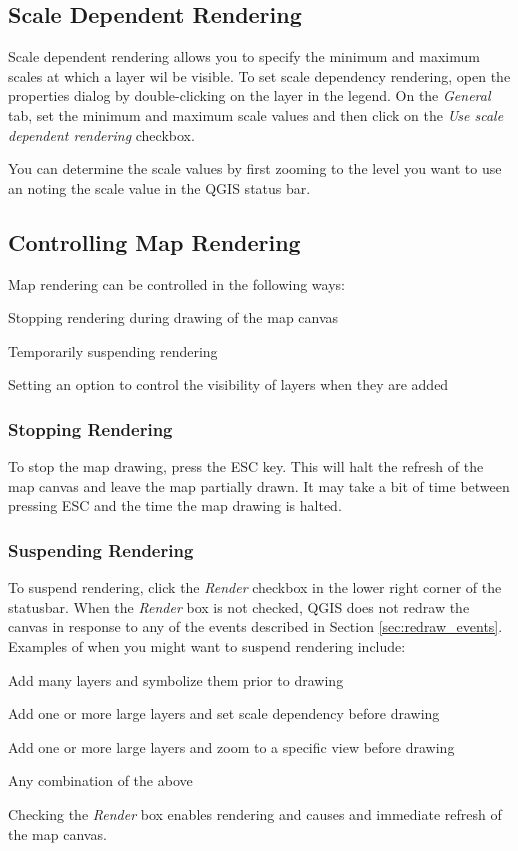 \documentclass[10pt,english]{article}
\begin{document}
\begin{onehalfspace}
\subsection{Scale Dependent Rendering}
Scale dependent rendering allows you to specify the minimum and maximum scales
at which a layer wil be visible.  To set scale dependency rendering, open the
properties dialog by double-clicking on the layer in the legend. On the
\textit{General} tab, set the minimum and maximum scale values and then click on
the \textit{Use scale dependent rendering} checkbox.

You can determine the scale values by first zooming to the level you want to use
an noting the scale value in the QGIS status bar.
\subsection{Controlling Map Rendering}
Map rendering can be controlled in the following ways:
\begin{compactenum}
\item Stopping rendering during drawing of the map canvas
\item Temporarily suspending rendering
\item Setting an option to control the visibility of layers when they are added
\end{compactenum}
\subsubsection{Stopping Rendering}
To stop the map drawing, press the ESC key. This will halt the refresh of the
map canvas and leave the map partially drawn. It may take a bit of time between
pressing ESC and the time the map drawing is halted.
\subsubsection{Suspending Rendering}
To suspend rendering, click the \textit{Render} checkbox in the lower right
corner of the statusbar. When the \textit{Render} box is not checked, QGIS does
not redraw the canvas in response to any of the events described in Section
\ref{sec:redraw_events}. Examples of when you might want to suspend rendering
include:
\begin{compactitem}
\item Add many layers and symbolize them prior to drawing
\item Add one or more large layers and set scale dependency before drawing
\item Add one or more large layers and zoom to a specific view before drawing
\item Any combination of the above
\end{compactitem}
Checking the \textit{Render} box enables rendering and causes and immediate
refresh of the map canvas.

\end{onehalfspace}
\end{document}
